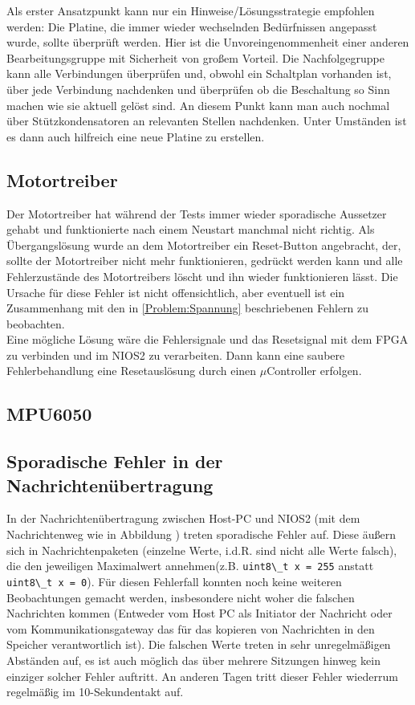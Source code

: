 Als erster Ansatzpunkt kann nur ein Hinweise/Lösungsstrategie empfohlen werden: Die Platine, die immer wieder wechselnden Bedürfnissen angepasst wurde, sollte überprüft werden. Hier ist die Unvoreingenommenheit einer anderen Bearbeitungsgruppe mit Sicherheit von großem Vorteil. Die Nachfolgegruppe kann alle Verbindungen überprüfen und, obwohl ein Schaltplan vorhanden ist, über jede Verbindung nachdenken und überprüfen ob die Beschaltung so Sinn machen wie sie aktuell gelöst sind. An diesem Punkt kann man auch nochmal über Stützkondensatoren an relevanten Stellen nachdenken. Unter Umständen ist es dann auch hilfreich eine neue Platine zu erstellen.

\subsection{Motortreiber}
Der Motortreiber hat während der Tests immer wieder sporadische Aussetzer gehabt und funktionierte nach einem Neustart manchmal nicht richtig. Als Übergangslösung wurde an dem Motortreiber ein Reset-Button angebracht, der, sollte der Motortreiber nicht mehr funktionieren, gedrückt werden kann und alle Fehlerzustände des Motortreibers löscht und ihn wieder funktionieren lässt.
Die Ursache für diese Fehler ist nicht offensichtlich, aber eventuell ist ein Zusammenhang mit den in \ref{Problem:Spannung} beschriebenen Fehlern zu beobachten.\\
Eine mögliche Lösung wäre die Fehlersignale und das Resetsignal mit dem \ac{FPGA} zu verbinden und im NIOS2 zu verarbeiten. Dann kann eine saubere Fehlerbehandlung eine Resetauslösung durch einen $\mu$Controller erfolgen.

\subsection{MPU6050}

\subsection{Sporadische Fehler in der Nachrichtenübertragung}
In der Nachrichtenübertragung zwischen Host-PC und NIOS2 (mit dem Nachrichtenweg wie in Abbildung ) treten sporadische Fehler auf. Diese äußern sich in Nachrichtenpaketen (einzelne Werte, i.d.R. sind nicht alle Werte falsch), die den jeweiligen Maximalwert annehmen(z.B. \lstinline|uint8\_t x = 255| anstatt \lstinline|uint8\_t x = 0|). Für diesen Fehlerfall konnten noch keine weiteren Beobachtungen gemacht werden, insbesondere nicht woher die falschen Nachrichten kommen (Entweder vom Host PC als Initiator der Nachricht oder vom Kommunikationsgateway das für das kopieren von Nachrichten in den Speicher verantwortlich ist). Die falschen Werte treten in sehr unregelmäßigen Abständen auf, es ist auch möglich das über mehrere Sitzungen hinweg kein einziger solcher Fehler auftritt. An anderen Tagen tritt dieser Fehler wiederrum regelmäßig im 10-Sekundentakt auf.

